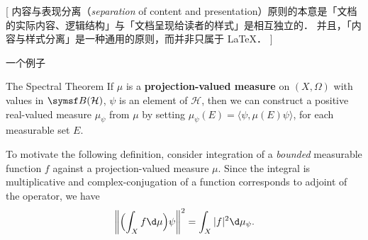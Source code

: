 [%
内容与表现分离（\emph{separation} of content and presentation）原则的本意是「文档的实际内容、逻辑结构」与「文档呈现给读者的样式」是相互独立的．
并且，「内容与样式分离」是一种通用的原则，而并非只属于 \LaTeX{}．%
]

\begin{frame}[fragile]{一个例子}
	
\end{frame}

\begin{frame}[fragile]{The Spectral Theorem}
	If $\mu$ is a \textbf{projection-valued measure} on $(X, \Omega)$ with values in $\symsf B(\mathcal H)$, $\psi$ is an element of $\mathcal H$, then we can construct a positive real-valued measure $\mu_\psi$ from $\mu$ by setting $\mu_\psi(E) = \langle\psi, \mu(E)\psi\rangle$, for each measurable set $E$.

	To motivate the following definition, consider integration of a \emph{bounded} measurable function $f$ against a projection-valued measure $\mu$. Since the integral is multiplicative and complex-conjugation of a function corresponds to adjoint of the operator, we have
	\[
		\biggl\Vert \Bigl(\int_X f \d \mu\Bigr)\psi \biggr\Vert^2 = \int_X \vert f\vert ^2 \d \mu_\psi.
	\]
\end{frame}

